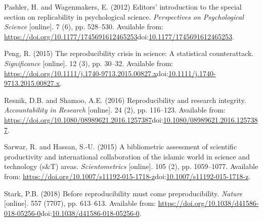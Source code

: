 \documentclass[]{article}
\begin{document}
\leavevmode\hypertarget{ref-Pashler2012}{}%
Pashler, H. and Wagenmakers, E. (2012) Editors' introduction to the
special section on replicability in psychological science.
\emph{Perspectives on Psychological Science} {[}online{]}. 7 (6), pp.
528--530. Available from:
\url{https://doi.org/10.1177/1745691612465253}doi:\href{https://doi.org/10.1177/1745691612465253}{10.1177/1745691612465253}.

\leavevmode\hypertarget{ref-Peng2015}{}%
Peng, R. (2015) The reproducibility crisis in science: A statistical
counterattack. \emph{Significance} {[}online{]}. 12 (3), pp. 30--32.
Available from:
\url{https://doi.org/10.1111/j.1740-9713.2015.00827.x}doi:\href{https://doi.org/10.1111/j.1740-9713.2015.00827.x}{10.1111/j.1740-9713.2015.00827.x}.

\leavevmode\hypertarget{ref-Resnik2016}{}%
Resnik, D.B. and Shamoo, A.E. (2016) Reproducibility and research
integrity. \emph{Accountability in Research} {[}online{]}. 24 (2), pp.
116--123. Available from:
\url{https://doi.org/10.1080/08989621.2016.1257387}doi:\href{https://doi.org/10.1080/08989621.2016.1257387}{10.1080/08989621.2016.1257387}.

\leavevmode\hypertarget{ref-Sarwar2015}{}%
Sarwar, R. and Hassan, S.-U. (2015) A bibliometric assessment of
scientific productivity and international collaboration of the islamic
world in science and technology (s\&T) areas. \emph{Scientometrics}
{[}online{]}. 105 (2), pp. 1059--1077. Available from:
\url{https://doi.org/10.1007/s11192-015-1718-z}doi:\href{https://doi.org/10.1007/s11192-015-1718-z}{10.1007/s11192-015-1718-z}.

\leavevmode\hypertarget{ref-Stark2018}{}%
Stark, P.B. (2018) Before reproducibility must come preproducibility.
\emph{Nature} {[}online{]}. 557 (7707), pp. 613--613. Available from:
\url{https://doi.org/10.1038/d41586-018-05256-0}doi:\href{https://doi.org/10.1038/d41586-018-05256-0}{10.1038/d41586-018-05256-0}.
\end{document}
